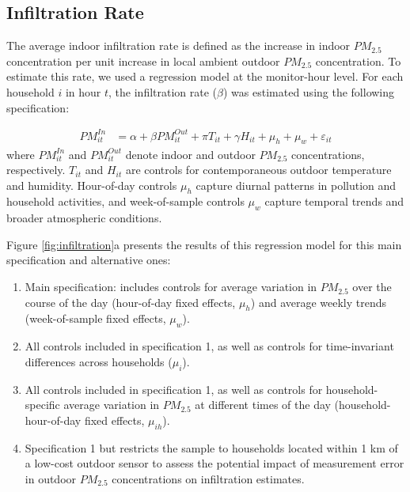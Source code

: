 \documentclass[9pt,twocolumn,twoside]{pnas-new}
\begin{document}
\subsection{Infiltration Rate}
The average indoor infiltration rate is defined as the increase in indoor $PM_{2.5}$ concentration per unit increase in local ambient outdoor $PM_{2.5}$ concentration. To estimate this rate, we used a regression model at the monitor-hour level. For each household $i$ in hour $t$, the infiltration rate ($\beta$) was estimated using the following specification:

\begin{align}
\label{eq:infiltration}
    PM^{In}_{it} &= \alpha + \beta PM^{Out}_{it} + \pi T_{it} + \gamma H_{it} + \mu_h + \mu_w + \varepsilon_{it}
\end{align}
where $PM^{In}_{it}$ and $PM^{Out}_{it}$ denote indoor and outdoor $PM_{2.5}$ concentrations, respectively. $T_{it}$ and $H_{it}$ are controls for contemporaneous outdoor temperature and humidity. Hour-of-day controls $\mu_h$ capture diurnal patterns in pollution and household activities, and week-of-sample controls $\mu_w$ capture temporal trends and broader atmospheric conditions.


Figure \ref{fig:infiltration}a presents the results of this regression model for this main specification and alternative ones: 
\begin{enumerate}
    \item Main specification: includes controls for average variation in $PM_{2.5}$ over the course of the day (hour-of-day fixed effects, $\mu_h$) and average weekly trends (week-of-sample fixed effects, $\mu_w$).
    \item All controls included in specification 1, as well as controls for time-invariant differences across households ($\mu_i$).
    \item All controls included in specification 1, as well as controls for household-specific average variation in $PM_{2.5}$ at different times of the day (household-hour-of-day fixed effects, $\mu_{ih}$).
    \item Specification 1 but restricts the sample to households located within 1 km of a low-cost outdoor sensor to assess the potential impact of measurement error in outdoor $PM_{2.5}$ concentrations on infiltration estimates.
\end{enumerate}
\end{document}
